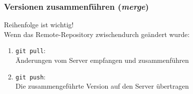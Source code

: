 \documentclass[
	ngerman, %
	aspectratio=169, %
	color={accentcolor=8b},
	colorframetitle=true,%
	authorontitle=true
]{tudabeamer}
\newcommand{\diffn}[1]{\textcolor{darkgreen}{#1}}
\begin{document}
\begin{frame}
			\end{frame}
		
			\begin{frame}
				\frametitle{Versionen zusammenführen (\textit{merge})}
				Reihenfolge ist wichtig!\\ Wenn das Remote-Repository zwischendurch geändert wurde:
				\begin{enumerate}
					\item \texttt{git pull}:\\Änderungen vom Server empfangen und zusammenführen
					\item \texttt{git push}:\\Die zusammengeführte Version auf den Server übertragen
				\end{enumerate}
			\end{frame}
		
	
\end{document}
